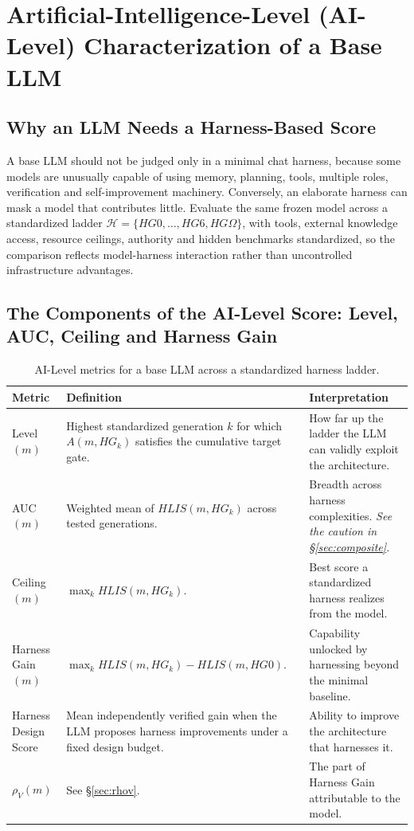 \documentclass[11pt]{article}
\theoremstyle{definition}
\newcommand{\Om}{\ensuremath{\Omega}}
\newcommand{\rhov}{\ensuremath{\rho_V}}
\begin{document}
\section{Artificial-Intelligence-Level (AI-Level) Characterization of a Base LLM}

\subsection{Why an LLM Needs a Harness-Based Score}

A base LLM should not be judged only in a minimal chat harness, because some models are unusually capable of using memory, planning, tools, multiple roles, verification and self-improvement machinery. Conversely, an elaborate harness can mask a model that contributes little. Evaluate the same frozen model across a standardized ladder $\mathcal{H} = \{HG0, \ldots, HG6, HG\Om{}\}$, with tools, external knowledge access, resource ceilings, authority and hidden benchmarks standardized, so the comparison reflects model-harness interaction rather than uncontrolled infrastructure advantages.

\subsection{The Components of the AI-Level Score: Level, AUC, Ceiling and Harness Gain}

\begin{table}[!htbp]
\centering\small
\begin{tabularx}{\textwidth}{@{}lYY@{}}
\toprule
Metric & Definition & Interpretation \\
\midrule
Level$(m)$ & Highest standardized generation $k$ for which $A(m,HG_k)$ satisfies the cumulative target gate. & How far up the ladder the LLM can validly exploit the architecture. \\
AUC$(m)$ & Weighted mean of $HLIS(m,HG_k)$ across tested generations. & Breadth across harness complexities. \emph{See the caution in \S\ref{sec:composite}.} \\
Ceiling$(m)$ & $\max_k HLIS(m,HG_k)$. & Best score a standardized harness realizes from the model. \\
Harness Gain$(m)$ & $\max_k HLIS(m,HG_k) - HLIS(m,HG0)$. & Capability unlocked by harnessing beyond the minimal baseline. \\
Harness Design Score & Mean independently verified gain when the LLM proposes harness improvements under a fixed design budget. & Ability to improve the architecture that harnesses it. \\
\textbf{$\rhov{}(m)$} & See \S\ref{sec:rhov}. & The part of Harness Gain attributable to the model. \\
\bottomrule
\end{tabularx}
\caption{AI-Level metrics for a base LLM across a standardized harness ladder.}
\label{tab:hilmetrics}
\end{table}
\end{document}
